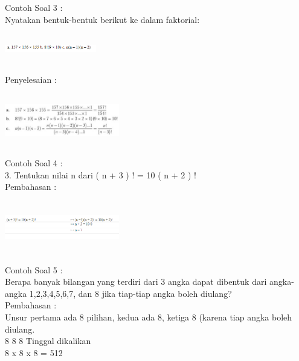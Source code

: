 \documentclass[11pt,fleqn]{book} %
\begin{document}
Contoh Soal 3 :\\

Nyatakan bentuk-bentuk berikut ke dalam faktorial:\\

\includegraphics[width = 4cm, height= 2cm]{Pictures/gen5.png}\\

Penyelesaian :\\
\includegraphics[width = 5cm, height=3cm]{Pictures/gen4.png}\\

Contoh Soal 4 :\\

3. Tentukan nilai n dari ( n + 3 ) ! = 10 ( n + 2 ) !\\

Pembahasan :\\


\includegraphics[width = 5cm, height= 3cm]{Pictures/gen6.png}\\


Contoh Soal 5 :\\

Berapa banyak bilangan yang terdiri dari
3 angka dapat dibentuk dari angka-angka 1,2,3,4,5,6,7, dan 8 jika tiap-tiap angka boleh diulang?\\

Pembahasan :\\

Unsur pertama ada 8 pilihan, kedua ada 8, ketiga 8 (karena tiap angka boleh diulang.\\
                                    8          8          8                      
                                    Tinggal dikalikan\\
                                                                                    8 x 8 x 8 = 512\\
\end{document}
